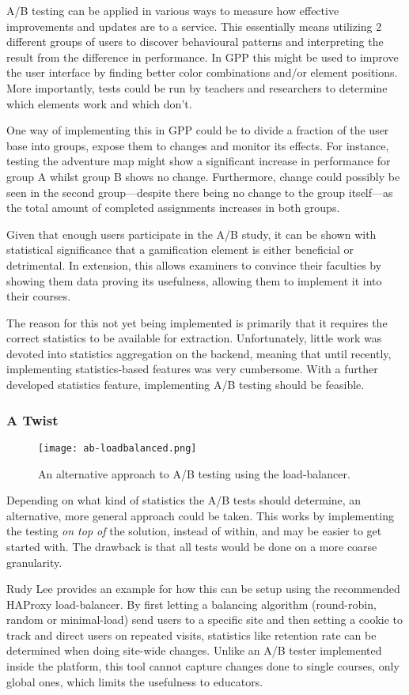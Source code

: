 A/B testing can be applied in various ways to measure how effective improvements and updates are to a service. This essentially means utilizing 2 different groups of users to discover behavioural patterns and interpreting the result from the difference in performance. In GPP this might be used to improve the user interface by finding better color combinations and/or element positions. More importantly, tests could be run by teachers and researchers to determine which elements work and which don't.

One way of implementing this in GPP could be to divide a fraction of the user base into groups, expose them to changes and monitor its effects. For instance, testing the adventure map might show a significant increase in performance for group A whilst group B shows no change. Furthermore, change could possibly be seen in the second group---despite there being no change to the group itself---as the total amount of completed assignments increases in both groups.

Given that enough users participate in the A/B study, it can be shown with statistical significance that a gamification element is either beneficial or detrimental. In extension, this allows examiners to convince their faculties by showing them data proving its usefulness, allowing them to implement it into their courses.

The reason for this not yet being implemented is primarily that it requires the correct statistics to be available for extraction. Unfortunately, little work was devoted into statistics aggregation on the backend, meaning that until recently, implementing statistics-based features was very cumbersome. With a further developed statistics feature, implementing A/B testing should be feasible.

\subsubsection{A Twist}
\begin{wrapfigure}[14]{r}{6cm}
    \centering
    \texttt{[image: ab-loadbalanced.png]}
    \caption{An alternative approach to A/B testing using the load-balancer.}
\end{wrapfigure}
Depending on what kind of statistics the A/B tests should determine, an alternative, more general approach could be taken. This works by implementing the testing \textit{on top of} the solution, instead of within, and may be easier to get started with. The drawback is that all tests would be done on a more coarse granularity.

Rudy Lee provides an example\cite{rudylee} for how this can be setup using the recommended HAProxy load-balancer. By first letting a balancing algorithm (round-robin, random or minimal-load) send users to a specific site and then setting a cookie to track and direct users on repeated visits, statistics like retention rate can be determined when doing site-wide changes. Unlike an A/B tester implemented inside the platform, this tool cannot capture changes done to single courses, only global ones, which limits the usefulness to educators.

